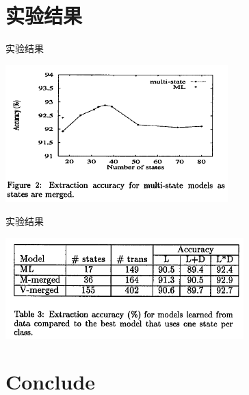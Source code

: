 \documentclass{beamer}
\begin{document}
\section{实验结果}
\begin{frame}{实验结果}
    \begin{center}
        \includegraphics[height=150pt]{report5/m-picture.png}
    \end{center}
\end{frame}

\begin{frame}{实验结果}
    \begin{center}
        \includegraphics[height=110pt]{report5/m-picture2.png}
    \end{center}
\end{frame}

\section{Conclude}
\end{document}
